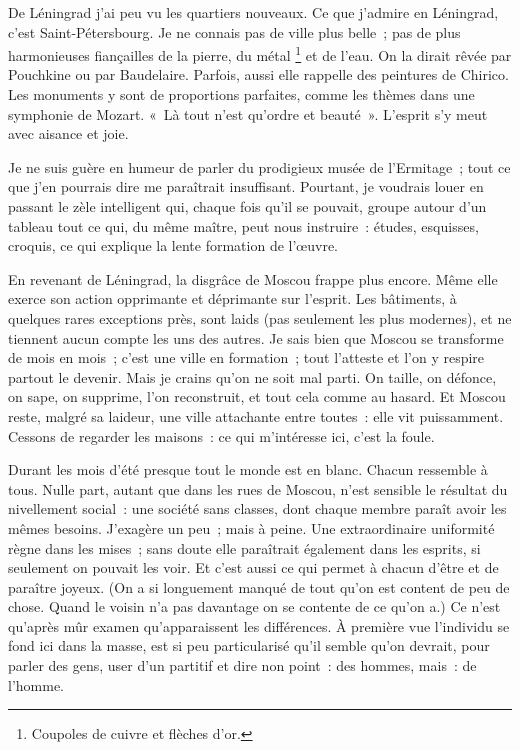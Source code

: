 \documentclass[french,twoside]{book} %
\newcommand\chaptercont{} %
\begin{document}
\chaptercont
\noindent De Léningrad j’ai peu vu les quartiers nouveaux. Ce que j’admire en Léningrad, c’est Saint-Pétersbourg. Je ne connais pas de ville plus belle ; pas de plus harmonieuses fiançailles de la pierre, du métal \footnote{Coupoles de cuivre et flèches d’or.} et de l’eau. On la dirait rêvée par Pouchkine ou par Baudelaire. Parfois, aussi elle rappelle des peintures de Chirico. Les monuments y sont de proportions parfaites, comme les thèmes dans une symphonie de Mozart. « Là tout n’est qu’ordre et beauté ». L’esprit s’y meut avec aisance et joie.\par
Je ne suis guère en humeur de parler du prodigieux musée de l’Ermitage ; tout ce que j’en pourrais dire me paraîtrait insuffisant. Pourtant, je voudrais louer en passant le zèle intelligent qui, chaque fois qu’il se pouvait, groupe autour d’un tableau tout ce qui, du même maître, peut nous instruire : études, esquisses, croquis, ce qui explique la lente formation de l’œuvre.\par
En revenant de Léningrad, la disgrâce de Moscou frappe plus encore. Même elle exerce son action opprimante et déprimante sur l’esprit. Les bâtiments, à quelques rares exceptions près, sont laids (pas seulement les plus modernes), et ne tiennent aucun compte les uns des autres. Je sais bien que Moscou se transforme de mois en mois ; c’est une ville en formation ; tout l’atteste et l’on y respire partout le devenir. Mais je crains qu’on ne soit mal parti. On taille, on défonce, on sape, on supprime, l’on reconstruit, et tout cela comme au hasard. Et Moscou reste, malgré sa laideur, une ville attachante entre toutes : elle vit puissamment. Cessons de regarder les maisons : ce qui m’intéresse ici, c’est la foule.\par
Durant les mois d’été presque tout le monde est en blanc. Chacun ressemble à tous. Nulle part, autant que dans les rues de Moscou, n’est sensible le résultat du nivellement social : une société sans classes, dont chaque membre paraît avoir les mêmes besoins. J’exagère un peu ; mais à peine. Une extraordinaire uniformité règne dans les mises ; sans doute elle paraîtrait également dans les esprits, si seulement on pouvait les voir. Et c’est aussi ce qui permet à chacun d’être et de paraître joyeux. (On a si longuement manqué de tout qu’on est content de peu de chose. Quand le voisin n’a pas davantage on se contente de ce qu’on a.) Ce n’est qu’après mûr examen qu’apparaissent les différences. À première vue l’individu se fond ici dans la masse, est si peu particularisé qu’il semble qu’on devrait, pour parler des gens, user d’un partitif et dire non point : des hommes, mais : de l’homme.\par
\end{document}
